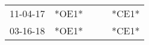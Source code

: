 \begin{supertabular}{lllll}
 11-04-17 &  *OE1* &   &   &  *CE1* \\
 03-16-18 &  *OE1* &   &   &  *CE1* \\
\end{supertabular}
